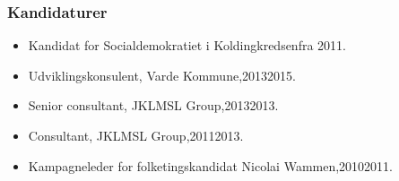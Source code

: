 \documentclass[11pt, a4paper]{awesome-cv}
\begin{document}
\begin{cvletter}
\subsubsection*{Kandidaturer}
\begin{itemize}
\item Kandidat for Socialdemokratiet i Koldingkredsenfra 2011.
\end{itemize}
\begin{itemize}
\item Udviklingskonsulent, Varde Kommune,20132015.
\item Senior consultant, JKLMSL Group,20132013.
\item Consultant, JKLMSL Group,20112013.
\item Kampagneleder for folketingskandidat Nicolai Wammen,20102011.
\end{itemize}
\end{cvletter}
\end{document}
